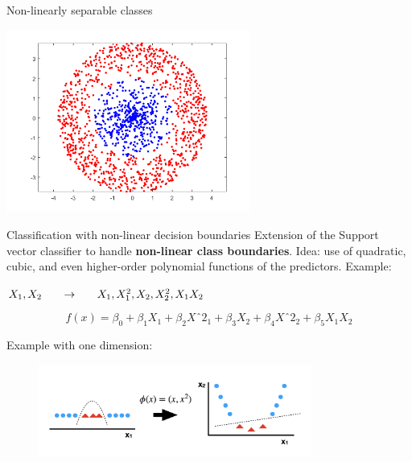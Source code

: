 \documentclass[notes]{beamer}          %
\begin{document}
\begin{frame}{Non-linearly separable classes}
\begin{center}
\includegraphics[height=6cm]{../figures/week_6/nonseparableclass.png}  
\end{center}


\end{frame}

\begin{frame}{Classification with non-linear decision boundaries}
Extension of the Support vector classifier to handle \textbf{non-linear class boundaries}. 
Idea: use of quadratic, cubic, and even higher-order polynomial functions of the predictors.
Example:
\begin{center}{
$X_1, X_2 \hspace{0.05\textwidth}\to\hspace{0.05\textwidth} X_1, X^2_1, X_2, X^2_2, X_1X_2$}
\end{center}
\begin{equation*}
	f(x)=\beta_0 + \beta_1X_1 + \beta_2Xˆ2_1 + \beta_3X_2 + 		\beta_4Xˆ2_2+ \beta_5X_1X_2 
\end{equation*}

Example with one dimension:
\begin{figure}
  \includegraphics[width=0.8\textwidth]{../figures/week_6/SVM_kernel}  
\end{figure}


\end{frame}
\end{document}
